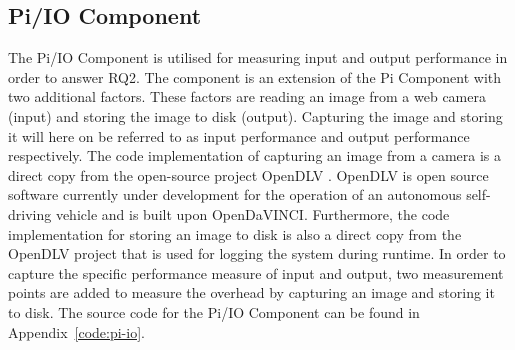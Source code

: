 


\subsection{Pi/IO Component}
\label{section:exp-units-piio}
The Pi/IO Component is utilised for measuring input and output performance in order to answer RQ2. The component is an extension of the Pi Component with two additional factors. These factors are reading an image from a web camera (input) and storing the image to disk (output). Capturing the image and storing it will here on be referred to as input performance and output performance respectively. The code implementation of capturing an image from a camera is a direct copy from the open-source project OpenDLV \cite{opendlv}. OpenDLV is open source software currently under development for the operation of an autonomous self-driving vehicle and is built upon OpenDaVINCI. Furthermore, the code implementation for storing an image to disk is also a direct copy from the OpenDLV project that is used for logging the system during runtime. In order to capture the specific performance measure of input and output, two measurement points are added to measure the overhead by capturing an image and storing it to disk. The source code for the Pi/IO Component can be found in Appendix~\ref{code:pi-io}.


